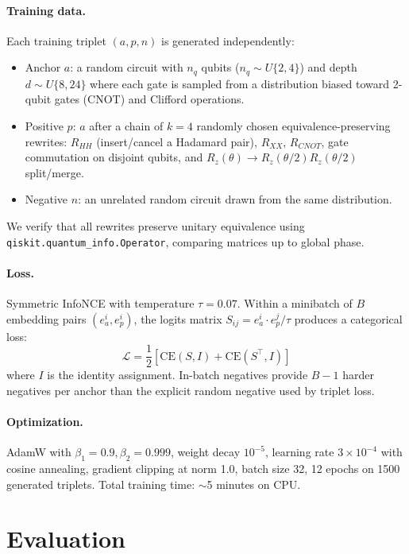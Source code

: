 \documentclass[11pt]{article}
\begin{document}
\paragraph{Training data.} Each training triplet $(a, p, n)$ is generated independently:
\begin{itemize}[topsep=2pt,itemsep=2pt]
    \item Anchor $a$: a random circuit with $n_q$ qubits ($n_q \sim U\{2,4\}$) and depth $d \sim U\{8,24\}$ where each gate is sampled from a distribution biased toward 2-qubit gates (CNOT) and Clifford operations.
    \item Positive $p$: $a$ after a chain of $k=4$ randomly chosen equivalence-preserving rewrites: $R_{HH}$ (insert/cancel a Hadamard pair), $R_{XX}$, $R_{CNOT}$, gate commutation on disjoint qubits, and $R_z(\theta) \rightarrow R_z(\theta/2) R_z(\theta/2)$ split/merge.
    \item Negative $n$: an unrelated random circuit drawn from the same distribution.
\end{itemize}
We verify that all rewrites preserve unitary equivalence using \texttt{qiskit.quantum\_info.Operator}, comparing matrices up to global phase.

\paragraph{Loss.} Symmetric InfoNCE \cite{infonce, clip} with temperature $\tau = 0.07$. Within a minibatch of $B$ embedding pairs $(e_a^i, e_p^i)$, the logits matrix $S_{ij} = e_a^i \cdot e_p^j / \tau$ produces a categorical loss:
$$\mathcal{L} = \frac{1}{2}\left[\text{CE}(S, I) + \text{CE}(S^\top, I)\right]$$
where $I$ is the identity assignment. In-batch negatives provide $B-1$ harder negatives per anchor than the explicit random negative used by triplet loss.

\paragraph{Optimization.} AdamW with $\beta_1 = 0.9, \beta_2 = 0.999$, weight decay $10^{-5}$, learning rate $3 \times 10^{-4}$ with cosine annealing, gradient clipping at norm 1.0, batch size 32, 12 epochs on 1500 generated triplets. Total training time: $\sim$5 minutes on CPU.

\section{Evaluation}
\end{document}
